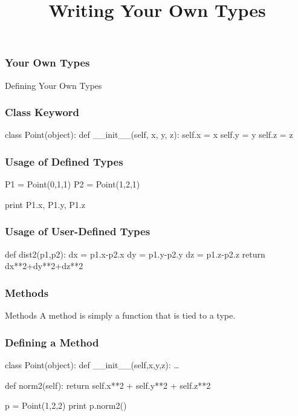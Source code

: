 
\title{Writing Your Own Types}


\begin{frame}[fragile] %
\frametitle{Your Own Types}

\begin{block}{Defining Your Own Types}
\end{block}

\end{frame}


\begin{frame}[fragile] %
\frametitle{Class Keyword}
\begin{python}
class Point(object):
    def __init__(self, x, y, z):
        self.x = x
        self.y = y
        self.z = z
\end{python}
\end{frame}

\begin{frame}[fragile] %
\frametitle{Usage of Defined Types}
\begin{python}
P1 = Point(0,1,1)
P2 = Point(1,2,1)

print P1.x, P1.y, P1.z
\end{python}
\end{frame}

\begin{frame}[fragile] %
\frametitle{Usage of User-Defined Types}
\begin{python}
def dist2(p1,p2):
    dx = p1.x-p2.x
    dy = p1.y-p2.y
    dz = p1.z-p2.z
    return dx**2+dy**2+dz**2
\end{python}
\end{frame}


\begin{frame}[fragile] %
\frametitle{Methods}
\begin{block}{Methods}
A \alert{method} is simply a function that is tied to a type.
\end{block}
\end{frame}

\begin{frame}[fragile] %
\frametitle{Defining a Method}
\begin{block}
class Point(object):
    def __init__(self,x,y,z):
        \ldots

    def norm2(self):
        return self.x**2 + self.y**2 + self.z**2

p = Point(1,2,2)
print p.norm2()
\end{block}
\end{frame}

